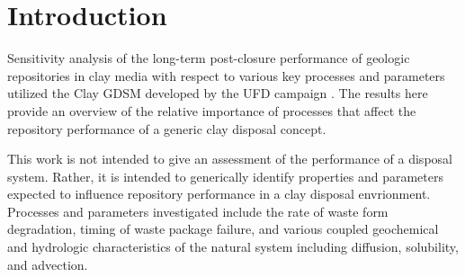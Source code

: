 
\section{Introduction}

Sensitivity analysis of the long-term post-closure performance of geologic 
repositories in clay media with respect to various key processes and parameters 
utilized the Clay \gls{GDSM} developed by the \gls{UFD} campaign 
\cite{clayton_generic_2011}.  The results here provide an overview of the 
relative importance of processes that affect the repository performance of a 
generic clay disposal concept.

This work is not intended to give an assessment of the performance of a disposal 
system. Rather, it is intended to  generically identify properties and 
parameters expected to influence repository performance in a clay disposal 
envrionment.  Processes and parameters investigated  include the rate of waste 
form degradation, timing of waste package failure, and various coupled 
geochemical and hydrologic characteristics of the natural system including 
diffusion, solubility, and advection.

